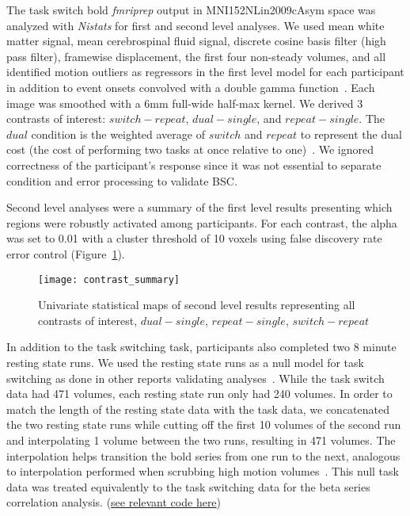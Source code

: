 \documentclass[phd,appendix,figures]{uithesis}
\begin{document}
The task switch bold \emph{fmriprep} output in MNI152NLin2009cAsym space
was analyzed with \emph{Nistats} for first and second level analyses.
We used mean white matter signal, mean cerebrospinal fluid signal,
discrete cosine basis filter (high pass filter), framewise displacement, the first four non-steady volumes, and
all identified motion outliers as regressors in the first level model for each participant
in addition to event onsets convolved with a double gamma function~\cite{Glover1999}.
Each image was smoothed with a 6mm full-wide half-max kernel.
We derived 3 contrasts of interest: $switch - repeat$, $dual- single$, and $repeat - single$.
The $dual$ condition is the weighted average of $switch$ and $repeat$ to represent the
dual cost (the cost of performing two tasks at once relative to one)~\cite{Wylie2000,Verhaeghen2003}.
We ignored correctness of the participant's response since it was not essential to
separate condition and error processing to validate BSC.

Second level analyses were a summary of the first level results presenting which
regions were robustly activated among participants.
For each contrast, the alpha was set to 0.01 with a cluster threshold of 10 voxels using
false discovery rate error control (Figure~\ref{fig:stat_maps}).

\begin{figure}[H]
  \centering
  \texttt{[image: contrast\_summary]}
  \caption[Univariate statisitcal maps]{
    Univariate statistical maps of second level results representing
    all contrasts of interest, $dual - single$, $repeat - single$, $switch - repeat$}
  \label{fig:stat_maps}
\end{figure}

In addition to the task switching task, participants also completed
two 8 minute resting state runs.
We used the resting state runs as a null model for task switching as done
in other reports validating analyses~\cite{Eklund2016,Olszowy2019}.
While the task switch data had 471 volumes, each resting state run only had
240 volumes.
In order to match the length of the resting state data with the task data, we concatenated
the two resting state runs while cutting off the first 10 volumes of the second run
and interpolating 1 volume between the two runs, resulting in 471 volumes.
The interpolation helps transition the bold series from one run to the next,
analogous to interpolation performed when scrubbing high motion volumes~\cite{Power2014a}. 
This null task data was treated equivalently to the task switching data for the
beta series correlation analysis.
(\href{https://github.com/jdkent/validateBetaSeries/tree/195ad5b4201971038dbbf8f73a3c537caf032743}{see relevant code here})
\end{document}

